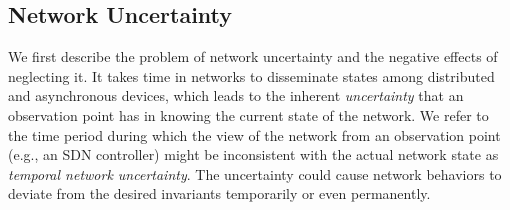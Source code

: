 

\subsection{Network Uncertainty}
\label{sec:uncertainty}

We first describe the problem of network uncertainty and the negative effects of neglecting it.
It takes time in networks to disseminate states among distributed and asynchronous devices,
which leads to the inherent \emph{uncertainty} that an observation point
has in knowing the current state of the network. %
We refer to the time period during which the view of the network from an observation point (e.g., an SDN controller)
might be inconsistent with the actual network state as {\em temporal network uncertainty}.
The uncertainty could cause network behaviors to deviate from the desired invariants 
temporarily or even permanently. 

